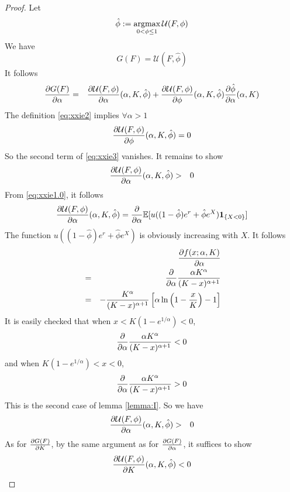 \documentclass{article}
\begin{document}
\begin{proof}
  Let
  \begin{equation}
    \label{eq:xxie2}
    \hat \phi := \operatorname*{argmax}_{0 < \phi \leq 1} \mathcal U(F, \phi)
  \end{equation}
  We have
  \[
  G(F) = \mathcal U(F, \hat\phi)
  \]
  It follows
  \begin{eqnarray}
    \frac{\partial G(F)}{\partial \alpha}
    &=&
    \frac{\partial \mathcal U(F, \phi)}{\partial \alpha}(\alpha, K, \hat\phi)
    + \frac{\partial \mathcal U(F, \phi)}{\partial \phi}(\alpha, K, \hat\phi)
    \frac{\partial \hat\phi}{\partial \alpha}(\alpha, K)
    \label{eq:xxie3}
  \end{eqnarray}
  The definition \eqref{eq:xxie2} implies $\forall \alpha > 1$
  \begin{equation}
    \label{eq:xxie4}
    \frac{\partial \mathcal U(F, \phi)}{\partial \phi}(\alpha, K, \hat \phi) = 0
  \end{equation}
  So the second term of \eqref{eq:xxie3} vanishes. It remains to show
  \begin{eqnarray*}
    \frac{\partial \mathcal U(F, \phi)}{\partial \alpha}(\alpha, K, \hat \phi)
    &>& 0
  \end{eqnarray*}
  From \eqref{eq:xxie1.0}, it follows
  \begin{eqnarray*}
    \frac{\partial \mathcal U(F, \phi)}{\partial \alpha}(\alpha, K, \hat\phi)
    = \frac{\partial}{\partial \alpha}\mathbb{E}[u((1 - \hat\phi) e^r + \hat\phi e^X) \mathbf{1}_{\{X < 0\}}]
  \end{eqnarray*}
  The function $u((1 - \hat\phi) e^r + \hat\phi e^X)$ is obviously
  increasing with $X$. It follows
  \begin{eqnarray*}
    && \frac{\partial f(x; \alpha, K)}{\partial \alpha} \\
    &=& \frac{\partial}{\partial \alpha} {\alpha K^\alpha \over (K - x)^{\alpha + 1}} \\
    &=&
    - {K^\alpha \over (K - x)^{\alpha + 1}}
    \left[
      \alpha
      \ln\left(
        1 - {x \over K}
      \right) - 1
    \right]
  \end{eqnarray*}
  It is easily checked that when $x < K(1 - e^{1/\alpha}) < 0$,
  \[
  \frac{\partial}{\partial \alpha} {\alpha K^\alpha \over (K - x)^{\alpha + 1}} < 0
  \]
  and when $K(1 - e^{1/\alpha}) < x < 0$,
  \[
  \frac{\partial}{\partial \alpha} {\alpha K^\alpha \over (K - x)^{\alpha + 1}} > 0
  \]
  This is the second case of lemma \ref{lemma:I}. So we have
  \begin{eqnarray*}
    \frac{\partial \mathcal U(F, \phi)}{\partial \alpha}(\alpha, K, \hat\phi) &>& 0
  \end{eqnarray*}
  As for $\frac{\partial G(F)}{\partial K}$, by the same argument as for
  $\frac{\partial G(F)}{\partial \alpha}$, it suffices to show
  \[
  \frac{\partial \mathcal U(F, \phi)}{\partial K}(\alpha, K, \hat\phi) < 0
\]
\end{proof}
\end{document}

